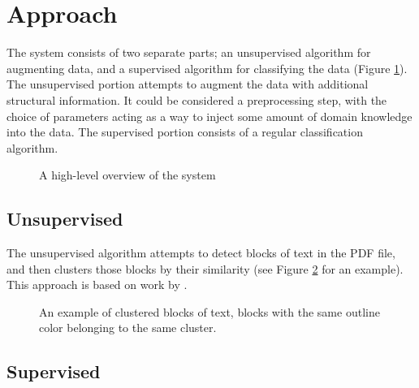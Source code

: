 \section*{Approach}

The system consists of two separate parts; an unsupervised algorithm for
augmenting data, and a supervised algorithm for classifying the data (Figure
\ref{fig:overview}). The unsupervised portion attempts to augment the data with
additional structural information. It could be considered a preprocessing step,
with the choice of parameters acting as a way to inject some amount of domain
knowledge into the data. The supervised portion consists of a regular
classification algorithm.

\begin{figure}[htbp]
  \centering
  \caption{A high-level overview of the system}
  \label{fig:overview}
\end{figure}

\subsection*{Unsupervised}
The unsupervised algorithm attempts to detect blocks of text in the PDF file,
and then clusters those blocks by their similarity (see Figure
\ref{fig:clustered} for an example). This approach is based on work by
\textcite{klampfl2014unsupervised}.

\begin{figure}[htbp]
  \centering
  \caption{An example of clustered blocks of text, blocks with the same outline
    color belonging to the same cluster.}
  \label{fig:clustered}
\end{figure}

\subsection*{Supervised}